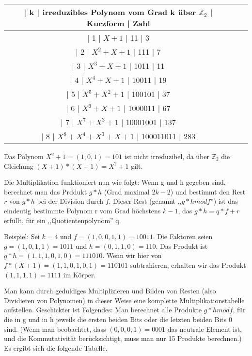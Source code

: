 \documentclass[a4paper]{article}
\begin{document}
\begin{multicols}{3}
    \begin{tabular}{c|c|c}
        | k  | irreduzibles Polynom vom Grad k über $\mathbb{Z}_2$ | Kurzform | Zahl \\\hline
        | 1  | $X+ 1$                       | 11    | 3                              \\
        | 2  | $X^2 +X+ 1$                     | 111    | 7                          \\
        | 3  | $X^3 +X+ 1$                     | 1011   | 11                         \\
        | 4  | $X^4 +X+ 1$                     | 10011   | 19                        \\
        | 5  | $X^5 +X^2 + 1$                   | 100101  | 37                       \\
        | 6  | $X^6 +X+ 1$                     | 1000011  | 67                       \\
        | 7  | $X^7 +X^3 + 1$                   | 10001001 | 137                     \\
        | 8  | $X^8 +X^4 +X^3 +X+ 1$                | 100011011 | 283
    \end{tabular}

    Das Polynom $X^2+1=(1,0,1)=101$ ist nicht irreduzibel, da über $\mathbb{Z}_2$ die Gleichung $(X+1)*(X+1)=X^2+1$ gilt.

    Die Multiplikation funktioniert nun wie folgt: Wenn g und h gegeben sind, berechnet man das Prddukt $g*h$ (Grad maximal $2k-2$) und bestimmt den Rest $r$ von $g*h$ bei der Division durch $f$. Dieser Rest (genannt ,,$g*h mod f$'') ist das eindeutig bestimmte Polynom r vom Grad höchstens $k-1$, das $g*h=q*f+r$ erfüllt, für ein ,,Quotientenpolynom'' q.

    Beispiel: Sei $k=4$ und $f=(1,0,0,1,1)=10011$. Die Faktoren seien $g=(1,0,1,1)=1011$ und $h=(0,1,1,0)=110$. Das Produkt ist $g*h=(1,1,1,0,1,0)=111010$. Wenn wir hier von $f*(X+1)=(1,1,0,1,0,1)=110101$ subtrahieren, erhalten wir das Produkt $(1,1,1,1)=1111$ im Körper.

    Man kann durch geduldiges Multiplizieren und Bilden von Resten (also Dividieren von Polynomen) in dieser Weise eine komplette Multiplikationstabelle aufstellen. Geschickter ist Folgendes: Man berechnet alle Produkte $g*h mod f$, für die in g und in h jeweils die ersten beiden Bits oder die letzten beiden Bits 0 sind. (Wenn man beobachtet, dass $(0,0,0,1)=0001$ das neutrale Element ist, und die Kommutativität berücksichtigt, muss man nur 15 Produkte berechnen.) Es ergibt sich die folgende Tabelle.


\end{multicols}
\end{document}
